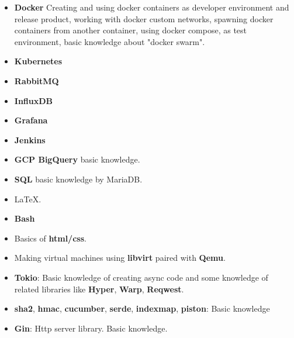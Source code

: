 \documentclass[11pt,a4paper,sans]{moderncv} %
\begin{document}
 {
    \begin{itemize}
        \item \textbf{Docker} Creating and using docker containers as developer environment and release product, working with docker custom networks, spawning docker containers from another container, using docker compose, as test environment, basic knowledge about "docker swarm".
        \item \textbf{Kubernetes}
        \item \textbf{RabbitMQ}
        \item \textbf{InfluxDB}
        \item \textbf{Grafana}
        \item \textbf{Jenkins}
        \item \textbf{GCP BigQuery} basic knowledge.
        \item \textbf{SQL} basic knowledge by MariaDB.
        \item \LaTeX.
        \item \textbf{Bash}
        \item Basics of \textbf{html/css}.
        \item Making virtual machines using \textbf{libvirt} paired with \textbf{Qemu}.
    \end{itemize}
    }
    
 {
        \begin{itemize}
            \item \textbf{Tokio}: Basic knowledge of creating async code and some knowledge of related libraries like \textbf{Hyper}, \textbf{Warp}, \textbf{Reqwest}.
            \item \textbf{sha2}, \textbf{hmac}, \textbf{cucumber}, \textbf{serde}, \textbf{indexmap}, \textbf{piston}: Basic knowledge
        \end{itemize}
    }


 {
    \begin{itemize}
        \item \textbf{Gin}: Http server library. Basic knowledge.
    \end{itemize}
}




\end{document}
